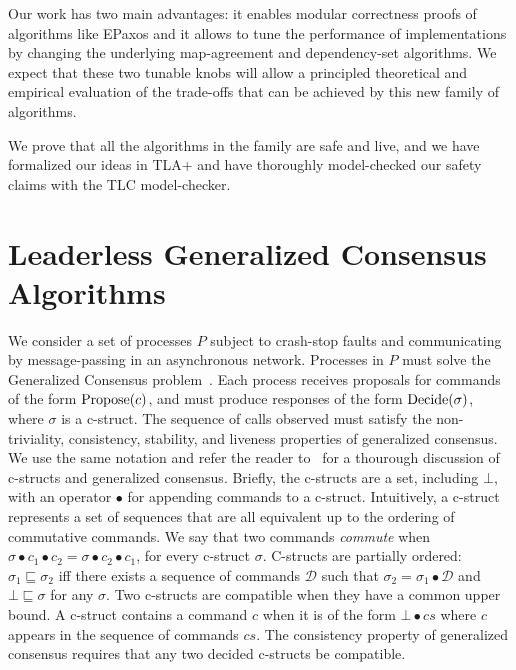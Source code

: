 Our work has two main advantages: it enables modular correctness proofs of algorithms like EPaxos and it allows to tune the performance of implementations by changing the underlying map-agreement and dependency-set algorithms. We expect that these two tunable knobs will allow a principled theoretical and empirical evaluation of the trade-offs that can be achieved by this new family of algorithms.

We prove that all the algorithms in the family are safe and live, and we have formalized our ideas in TLA+ and have thoroughly model-checked our safety claims with the TLC model-checker.

\section{Leaderless Generalized Consensus Algorithms}

We consider a set of processes $P$ subject to crash-stop faults and communicating by message-passing in an asynchronous network. Processes in $P$ must solve the Generalized Consensus problem~\cite{Lamport05GeneralizeConsensus}. Each process receives proposals for commands of the form $\operatorname{Propose}(c)$, and must produce responses of the form $\operatorname{Decide}(\sigma)$, where $\sigma$ is a c-struct. 
The sequence of calls observed must satisfy the non-triviality, consistency, stability, and liveness properties of generalized consensus.
We use the same notation and refer the reader to~\cite{Lamport05GeneralizeConsensus} for a thourough discussion of c-structs and generalized consensus. Briefly, the c-structs are a set, including $\bot$, with an operator $\bullet$ for appending commands to a c-struct. Intuitively, a c-struct represents a set of sequences that are all equivalent up to the ordering of commutative commands.
We say that two commands \textit{commute} when $\sigma\bullet c_1\bullet c_2 =  \sigma\bullet c_2\bullet c_1 $, for every c-struct $\sigma$.
C-structs are partially ordered: $\sigma_1\sqsubseteq \sigma_2$ iff there exists a sequence of commands $\mathcal{D}$ such that $\sigma_2 = \sigma_1\bullet \mathcal{D}$ and $\bot\sqsubseteq \sigma$ for any
$\sigma$. Two c-structs are compatible when they have a
common upper bound. A c-struct contains a command $c$ when it is of the form $\bot\bullet cs$ where $c$ appears in the sequence of commands $cs$. The consistency property of generalized consensus requires that any two decided c-structs be compatible.


